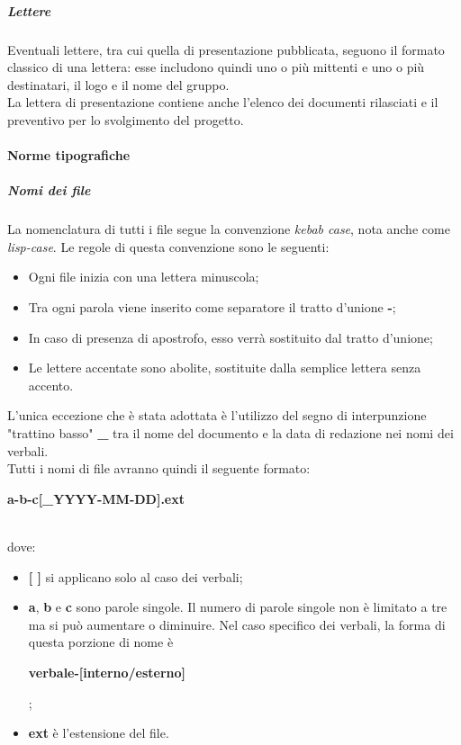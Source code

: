 \documentclass[../norme-di-progetto.tex]{subfiles}
\begin{document}
\subparagraph{Lettere}
Eventuali lettere, tra cui quella di presentazione pubblicata, seguono il formato classico di una lettera: esse includono quindi uno o più mittenti e uno o più destinatari, il logo e il nome del gruppo. \\
La lettera di presentazione contiene anche l'elenco dei documenti rilasciati e il preventivo per lo svolgimento del progetto.

\paragraph{Norme tipografiche}
\subparagraph{Nomi dei file}
La nomenclatura di tutti i file segue la convenzione \textit{kebab case}, nota anche come \textit{lisp-case}. Le regole di questa convenzione sono le seguenti:
\begin{itemize}
  \item Ogni file inizia con una lettera minuscola;
  \item Tra ogni parola viene inserito come separatore il tratto d'unione \textbf{-};
  \item In caso di presenza di apostrofo, esso verrà sostituito dal tratto d'unione;
  \item Le lettere accentate sono abolite, sostituite dalla semplice lettera senza accento.
\end{itemize}
L'unica eccezione che è stata adottata è l'utilizzo del segno di interpunzione "trattino basso" \textbf{\_} tra il nome del documento e la data di redazione nei nomi dei verbali. \\
Tutti i nomi di file avranno quindi il seguente formato: \\ \centerline{\textbf{a-b-c[\_YYYY-MM-DD].ext}} \\
dove:
\begin{itemize}
  \item \textbf{[ ]} si applicano solo al caso dei verbali;
  \item \textbf{a}, \textbf{b} e \textbf{c} sono parole singole. Il numero di parole singole non è limitato a tre ma si può aumentare o diminuire. Nel caso specifico dei verbali, la forma di questa porzione di nome è \\ \centerline{\textbf{verbale-[interno/esterno]}};
  \item \textbf{ext} è l'estensione del file.
\end{itemize}
\end{document}
